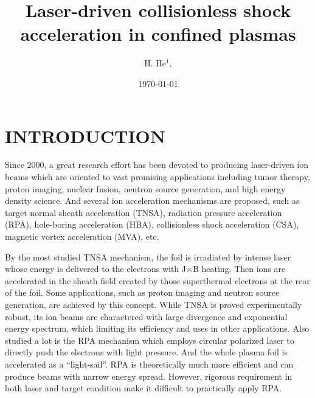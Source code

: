 \documentclass[12pt]{iopart}
\begin{document}
\title[]{Laser-driven collisionless shock acceleration in confined plasmas}

\author{H. He$^1$, }
\address{$^1$ Center for Applied Physics and Technology, HEDPS, State Key Laboratory of Nuclear Physics and Technology, and School of Physics, Peking University, Beijing, 100871, China}

\date{\today}

\begin{abstract}


\end{abstract}

\pacs{}

\maketitle
\section{INTRODUCTION}
\label{Introduction}
Since 2000, a great research effort has been devoted to producing laser-driven ion beams\cite{daido_review_2012,macchi_ion_2013} which are oriented to vast promising applications including tumor therapy, proton imaging, nuclear fusion, neutron source generation, and high energy density science. And several ion acceleration mechanisms are proposed, such as target normal sheath acceleration (TNSA), radiation pressure acceleration (RPA), hole-boring acceleration (HBA), collisionless shock acceleration (CSA), magnetic vortex acceleration (MVA), etc. 

By the most studied TNSA mechanism, the foil is irradiated by intense laser whose energy is delivered to the electrons with J×B heating. Then ions are accelerated in the sheath field created by those superthermal electrons at the rear of the foil. Some applications, such as proton imaging and neutron source generation, are achieved by this concept. While TNSA is proved experimentally robust, its ion beams are charactered with large divergence and exponential energy spectrum, which limiting its efficiency and uses in other applications. Also studied a lot is the RPA mechanism which employs circular polarized laser to directly push the electrons with light pressure. And the whole plasma foil is accelerated as a “light-sail”. RPA is theoretically much more efficient and can produce beams with narrow energy spread. However, rigorous requirement in both laser and target condition make it difficult to practically apply RPA.
\end{document}
